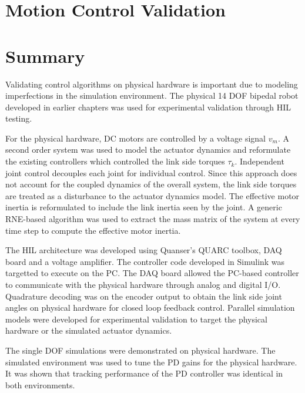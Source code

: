 \cleardoublepage

\section{Motion Control Validation} %
\label{sec:motion_control_validation}
\Incomplete

\section{Summary} %
\label{sec:experiments_summary}
Validating control algorithms on physical hardware is important due to modeling imperfections in the simulation environment. The physical 14 DOF bipedal robot developed in earlier chapters was used for experimental validation through HIL testing. 

For the physical hardware, DC motors are controlled by a voltage signal $v_m$. A second order system was used to model the actuator dynamics and reformulate the existing controllers which controlled the link side torques $\tau _k$. Independent joint control decouples each joint for individual control. Since this approach does not account for the coupled dynamics of the overall system, the link side torques are treated as a disturbance to the actuator dynamics model. The effective motor inertia is reformulated to include the link inertia seen by the joint. A generic RNE-based algorithm was used to extract the mass matrix of the system at every time step to compute the effective motor inertia.

The HIL architecture was developed using Quanser's QUARC toolbox, DAQ board and a voltage amplifier. The controller code developed in Simulink was targetted to execute on the PC. The DAQ board allowed the PC-based controller to communicate with the physical hardware through analog and digital I/O. Quadrature decoding was on the encoder output to obtain the link side joint angles on physical hardware for closed loop feedback control. Parallel simulation models were developed for experimental validation to target the physical hardware or the simulated actuator dynamics. 

The single DOF simulations were demonstrated on physical hardware. The simulated environment was used to tune the PD gains for the physical hardware. It was shown that tracking performance of the PD controller was identical in both environments.  

\Incomplete

